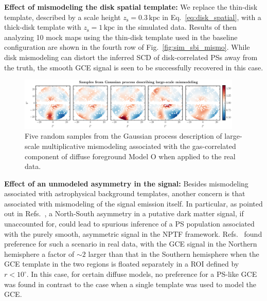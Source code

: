 \documentclass[prd,aps,10pt,nofootinbib,twocolumn,superscriptaddress,preprintnumbers,balancelastpage,longbibliography]{revtex4-1}
\begin{document}
\noindent
\textbf{Effect of mismodeling the disk spatial template:} 
We replace the thin-disk template, described by a scale height $z_\mathrm{s} = 0.3\,\mathrm{kpc}$ in Eq.~\eqref{eq:disk_spatial}, with a thick-disk template with $z_\mathrm{s} = 1\,\mathrm{kpc}$ in the simulated data. Results of then analyzing 10 mock maps using the thin-disk template used in the baseline configuration are shown in the fourth row of Fig.~\ref{fig:sim_sbi_mismo}. While disk mismodeling can distort the inferred SCD of disk-correlated PSs away from the truth, the smooth GCE signal is seen to be successfully recovered in this case. \\

%
\begin{figure}
    \centering
    \includegraphics[width=0.95\textwidth]{plots/dd_mismo_map.pdf}
    \caption{Five random samples from the Gaussian process description of large-scale multiplicative mismodeling associated with the gas-correlated component of diffuse foreground Model O when applied to the real \Fermi data.}
    \label{fig:dd_mismo_map}
    \end{figure}

\noindent
\textbf{Effect of an unmodeled asymmetry in the signal:}
Besides mismodeling associated with astrophysical background templates, another concern is that associated with mismodeling of the signal emission itself. In particular, as pointed out in Refs.~\cite{Leane:2020nmi,Leane:2020pfc}, a North-South asymmetry in a putative dark matter signal, if unaccounted for, could lead to spurious inference of a PS population associated with the purely smooth, asymmetric signal in the NPTF framework. Refs.~\cite{Leane:2020nmi,Leane:2020pfc} found preference for such a scenario in real \Fermi data, with the GCE signal in the Northern hemisphere a factor of $\sim2$ larger than that in the Southern hemisphere when the GCE template in the two regions is floated separately in a ROI defined by $r < 10^\circ$. In this case, for certain diffuse models, no preference for a PS-like GCE was found in contrast to the case when a single template was used to model the GCE. 
\end{document}
